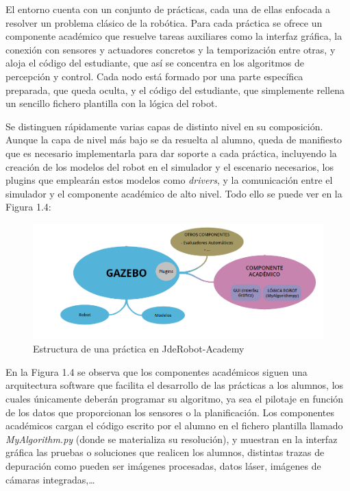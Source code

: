 El entorno cuenta con un conjunto de prácticas, cada una de ellas enfocada a resolver un problema clásico de la robótica. Para cada práctica se ofrece un componente académico que resuelve tareas auxiliares como la interfaz gráfica, la conexión con sensores y actuadores concretos y la temporización entre otras, y  aloja el código del estudiante, que así se concentra en los algoritmos de percepción y control. Cada nodo está formado por una parte específica preparada, que queda oculta, y el código del estudiante, que simplemente rellena un sencillo fichero plantilla con la lógica del robot.

Se distinguen rápidamente varias capas de distinto nivel en su composición. Aunque la capa de nivel más bajo se da resuelta al alumno, queda de manifiesto que es necesario implementarla para dar soporte a cada práctica, incluyendo  la creación de los modelos del robot en el simulador y el escenario necesarios, los plugins que emplearán estos modelos como \textit{drivers}, y la comunicación entre el simulador y el componente académico de alto nivel. Todo ello se puede ver en la Figura 1.4: 

\begin{figure}[H]
  \begin{center}
    \includegraphics[width=0.9\linewidth]{figures/estructura_jde.png}
		\caption{Estructura de una práctica en JdeRobot-Academy}
		\label{fig.estructura}
		\end{center}
\end{figure}

En la Figura 1.4 se observa que los componentes académicos siguen una arquitectura software que facilita el desarrollo de las prácticas a los alumnos, los cuales únicamente deberán programar su algoritmo, ya sea el pilotaje en función de los datos que proporcionan los sensores o la planificación. Los componentes académicos cargan el código escrito por el alumno en el fichero plantilla llamado \textit{MyAlgorithm.py} (donde se materializa su resolución), y muestran en la interfaz  gráfica las pruebas o soluciones que realicen los alumnos, distintas trazas de depuración como pueden ser imágenes procesadas, datos láser, imágenes de cámaras integradas,…


